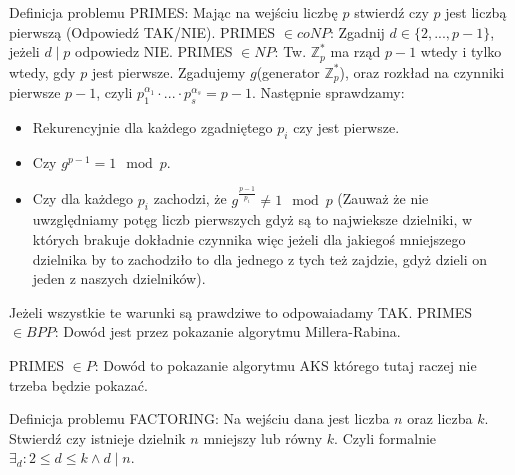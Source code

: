 Definicja problemu PRIMES:\newline
Mając na wejściu liczbę $p$ stwierdź czy $p$ jest liczbą pierwszą (Odpowiedź TAK/NIE).
\newline \newline
PRIMES $\in coNP$: \newline
Zgadnij $d \in \{2,...,p-1\}$, jeżeli $d \mid p$ odpowiedz NIE.
\newline \newline
PRIMES $\in NP$: \newline
Tw. $\mathbb{Z}_p^*$ ma rząd $p-1$ wtedy i tylko wtedy, gdy $p$ jest pierwsze.\newline
Zgadujemy $g$(generator $\mathbb{Z}_p^*$), oraz rozkład na czynniki pierwsze $p-1$, czyli $p_1^{\alpha_1}\cdot ... \cdot p_s^{\alpha_s} = p-1$. Następnie sprawdzamy:
\begin{itemize}
    \item Rekurencyjnie dla każdego zgadniętego $p_i$ czy jest pierwsze.
    \item Czy $g^{p-1} = 1 \mod p$.
    \item Czy dla każdego $p_i$ zachodzi, że $g^{\frac{p-1}{p_i}} \neq 1 \mod p$ (Zauważ że nie uwzględniamy potęg liczb pierwszych gdyż są to najwieksze dzielniki, w których brakuje dokładnie czynnika więc jeżeli dla jakiegoś mniejszego dzielnika by to zachodziło to dla jednego z tych też zajdzie, gdyż dzieli on jeden z naszych dzielników).
\end{itemize}
Jeżeli wszystkie te warunki są prawdziwe to odpowaiadamy TAK.
\newline \newline
PRIMES $\in BPP$: \newline
Dowód jest przez pokazanie algorytmu Millera-Rabina.


PRIMES $\in P$:\newline
Dowód to pokazanie algorytmu AKS którego tutaj raczej nie trzeba będzie pokazać.


Definicja problemu FACTORING:\newline
Na wejściu dana jest liczba $n$ oraz liczba $k$. Stwierdź czy istnieje dzielnik $n$ mniejszy lub równy $k$. Czyli formalnie $\exists_d: 2 \leq d \leq k \land d \mid n$.
\newline \newline

